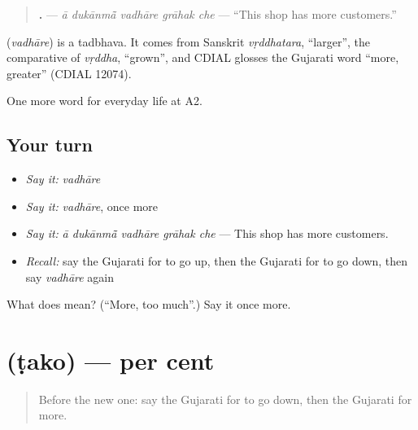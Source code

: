 \begin{quote}
\textbf{    .} — \emph{ā dukānmā̃ vadhāre grāhak che} — \textquotedblleft{}This shop has more customers.\textquotedblright{}
\end{quote}

\begin{cousinweb}
\textbf{} (\emph{vadhāre}) is a tadbhava. It comes from Sanskrit \emph{vṛddhatara}, \textquotedblleft{}larger\textquotedblright{}, the comparative of \emph{vṛddha}, \textquotedblleft{}grown\textquotedblright{}, and CDIAL glosses the Gujarati word \textquotedblleft{}more, greater\textquotedblright{} (CDIAL 12074).
\end{cousinweb}

\begin{grammarlens}[title={What you've built}]
One more word for everyday life at A2.
\end{grammarlens}

\subsection*{Your turn}
\begin{itemize}
\raggedright
  \item \emph{Say it:} \emph{vadhāre}
  \item \emph{Say it:} \emph{vadhāre}, once more
  \item \emph{Say it:} \emph{ā dukānmā̃ vadhāre grāhak che} — This shop has more customers.
  \item \emph{Recall:} say the Gujarati for to go up, then the Gujarati for to go down, then say \emph{vadhāre} again
\end{itemize}

\begin{tcolorbox}[breakable,colback=teal!4,colframe=teal!35!black,title={Before you move on}]
What does  mean? (\textquotedblleft{}More, too much\textquotedblright{}.) Say it once more.
\end{tcolorbox}
\section[\texorpdfstring{\gu{ટકો} (ṭako)}{ટકો (ṭako)}]{ (ṭako) — per cent}

\label{lesson:GU-C187-tako}



\begin{quote}
Before the new one: say the Gujarati for to go down, then the Gujarati for more.
\end{quote}


